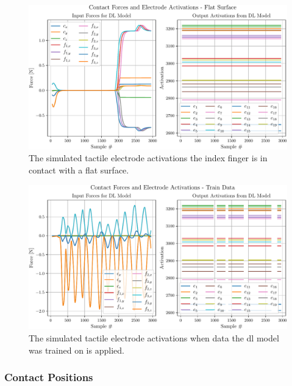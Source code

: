 \begin{figure}[!h]
	\begin{center}
		\includegraphics[width=\textwidth]{chapters/1-tactile-perception/fig/matplotlib/flat-contact-graph.pdf}
	\end{center}
	\caption{The simulated tactile electrode activations the index finger is in contact with a flat surface.}
	\label{fig:flat-contact-graph}
\end{figure}
\begin{figure}[!h]
	\begin{center}
		\includegraphics[width=\textwidth]{chapters/1-tactile-perception/fig/matplotlib/train-contact-graph.pdf}
	\end{center}
	\caption{The simulated tactile electrode activations when data the \gls{dl} model was trained on is applied.}
	\label{fig:train-contact-graph}
\end{figure}

\subsubsection{Contact Positions}

